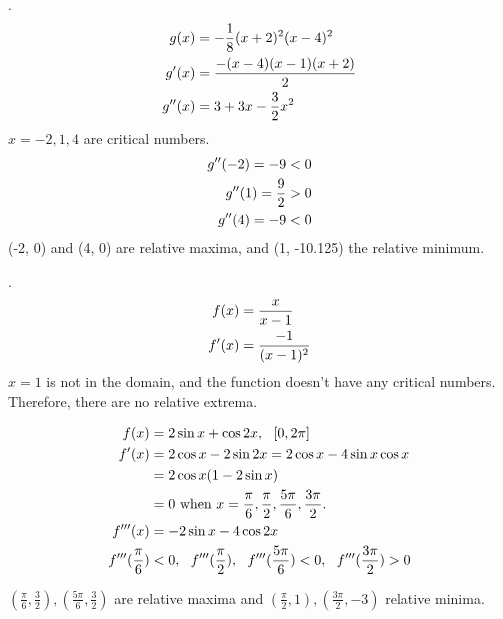 \documentclass[11pt]{article}
\newcommand*{\vs}{\vspace{1cm}}
\newcommand*{\next}{\noindent}
\newcommand*{\set}{\setcounter{equation}{0}}
\begin{document}
\vs
\next
46. \begin{align}
    \set
    g(x)&=-\frac{1}{8}(x+2)^2(x-4)^2\\
    g'(x)&=\frac{-(x-4)(x-1)(x+2)}{2}\\
    g''(x)&=3+3x-\frac{3}{2}x^2
\end{align}
$x=-2, 1, 4$ are critical numbers.
\begin{align}
    \set
    g''(-2)=-9<0\\
    g''(1)=\frac{9}{2}>0\\
    g''(4)=-9<0
\end{align}
(-2, 0) and (4, 0) are relative maxima, and (1, -10.125) the relative minimum.

\vs
\next
50.\begin{align}
    \set
    f(x)&=\frac{x}{x-1}\\
    f'(x)&=\frac{-1}{(x-1)^2}
\end{align}
$x=1$ is not in the domain, and the function doesn't have any critical numbers. Therefore, there are no relative extrema.

\vs
\next
52\begin{align}
    \set
    f(x)&=2\sin x+\cos 2x,\,\,\,\,[0, 2\pi]\\
    f'(x)&=2\cos x-2\sin 2x=2\cos x-4\sin x\cos x\\
    &=2\cos x(1-2\sin x)\\
    &=0\,\,\text{when}\,\, x=\frac{\pi}{6}, \frac{\pi}{2}, \frac{5\pi}{6}, \frac{3\pi}{2}.\\
    f'''(x)&=-2\sin x-4\cos 2x\\
    f'''(\frac{\pi}{6})&<0,\,\,\,\, f'''(\frac{\pi}{2}),\,\,\,\, f'''(\frac{5\pi}{6})<0,\,\,\,\, f'''(\frac{3\pi}{2})>0
\end{align}

$\left(\frac{\pi}{6}, \frac{3}{2}\right), \left(\frac{5\pi}{6}, \frac{3}{2}\right)$ are relative maxima and $\left(\frac{\pi}{2}, 1\right), \left(\frac{3\pi}{2}, -3\right)$ relative minima.
\end{document}
